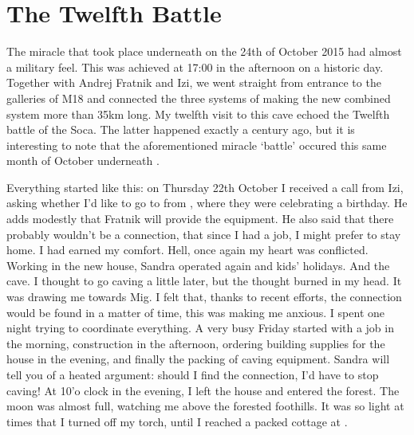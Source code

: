 

\section{The Twelfth Battle}


The miracle that took place underneath  on the 24th of October 2015 had almost a military feel. This was achieved at 17:00 in the afternoon on a historic day. Together with Andrej Fratnik and Izi, we went straight from  entrance to the galleries of M18 and connected the three systems of  making the new combined system more than 35km long. My twelfth visit to this cave echoed the Twelfth battle of the Soca. The latter happened exactly a century ago, but it is interesting to note that the aforementioned miracle `battle' occured this same month of October underneath .   



Everything started like this: on Thursday 22th October I received a call from Izi, asking whether I'd like to go to  from , where they were celebrating a birthday. He adds modestly that Fratnik will provide the equipment. He also said that there probably wouldn't be a connection, that since I had a job, I might prefer to stay home. I had earned my comfort. Hell, once again my heart was conflicted. Working in the new house, Sandra operated again and kids' holidays. And the cave. I thought to go caving a little later, but the thought burned in my head. It was drawing me towards Mig. I felt that, thanks to recent efforts, the connection would be found in a matter of time, this was making me anxious. I spent one night trying to coordinate everything. A very busy Friday started with a job in the morning,  construction in the afternoon, ordering building supplies for the house in the evening, and finally the packing of caving equipment. Sandra will tell you of a heated argument: should I find the connection, I'd have to stop caving!  At 10'o clock in the evening, I left the house and entered the forest.  The moon was almost full, watching me above the forested foothills. It was so light at times that I turned off my torch, until I reached a packed cottage at .

